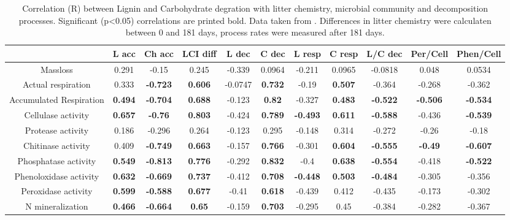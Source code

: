 \documentclass[authoryear,preprint,review,12pt]{elsarticle}
\begin{document}
\begin{table}[h!]
\begin{center}
\caption{Correlation (R) between Lignin and Carbohydrate degration with litter chemistry, microbial community and decomposition processes. Significant (p<0.05) correlations are printed bold. Data taken from \cite{Mooshammer2011, Leitner2011}. Differences in litter chemistry were calculaten between 0 and 181 days, process rates were measured after 181 days.}
\label{corrtable}
{\tiny
\begin{tabular}{ccccccccccc}
  \hline
 & L acc & Ch acc & LCI diff & L dec & C dec & L resp & C resp & L/C dec & Per/Cell & Phen/Cell \\ 
  \hline
Massloss & 0.291 & -0.15 & 0.245 & -0.339 & 0.0964 & -0.211 & 0.0965 & -0.0818 & 0.048 & 0.0534 \\ 
  Actual respiration & 0.333 & \textbf{ -0.723 } & \textbf{ 0.606 } & -0.0747 & \textbf{ 0.732 } & -0.19 & \textbf{ 0.507 } & -0.364 & -0.268 & -0.362 \\ 
  Accumulated Respiration & \textbf{ 0.494 } & \textbf{ -0.704 } & \textbf{ 0.688 } & -0.123 & \textbf{ 0.82 } & -0.327 & \textbf{ 0.483 } & \textbf{ -0.522 } & \textbf{ -0.506 } & \textbf{ -0.534 } \\ 
  Cellulase activity & \textbf{ 0.657 } & \textbf{ -0.76 } & \textbf{ 0.803 } & -0.424 & \textbf{ 0.789 } & \textbf{ -0.493 } & \textbf{ 0.611 } & \textbf{ -0.588 } & -0.436 & \textbf{ -0.539 } \\ 
  Protease activity & 0.186 & -0.296 & 0.264 & -0.123 & 0.295 & -0.148 & 0.314 & -0.272 & -0.26 & -0.18 \\ 
  Chitinase activity & 0.409 & \textbf{ -0.749 } & \textbf{ 0.663 } & -0.157 & \textbf{ 0.766 } & -0.301 & \textbf{ 0.604 } & \textbf{ -0.555 } & \textbf{ -0.49 } & \textbf{ -0.607 } \\ 
  Phosphatase activity & \textbf{ 0.549 } & \textbf{ -0.813 } & \textbf{ 0.776 } & -0.292 & \textbf{ 0.832 } & -0.4 & \textbf{ 0.638 } & \textbf{ -0.554 } & -0.418 & \textbf{ -0.522 } \\ 
  Phenoloxidase activity & \textbf{ 0.632 } & \textbf{ -0.669 } & \textbf{ 0.737 } & -0.412 & \textbf{ 0.708 } & \textbf{ -0.448 } & \textbf{ 0.503 } & \textbf{ -0.484 } & -0.305 & -0.356 \\ 
  Peroxidase activity & \textbf{ 0.599 } & \textbf{ -0.588 } & \textbf{ 0.677 } & -0.41 & \textbf{ 0.618 } & -0.439 & 0.412 & -0.435 & -0.173 & -0.302 \\ 
  N mineralization & \textbf{ 0.466 } & \textbf{ -0.664 } & \textbf{ 0.65 } & -0.159 & \textbf{ 0.703 } & -0.295 & 0.45 & -0.384 & -0.282 & -0.367 \\ 

\end{tabular}}
\end{center}
\end{table}
\end{document}
